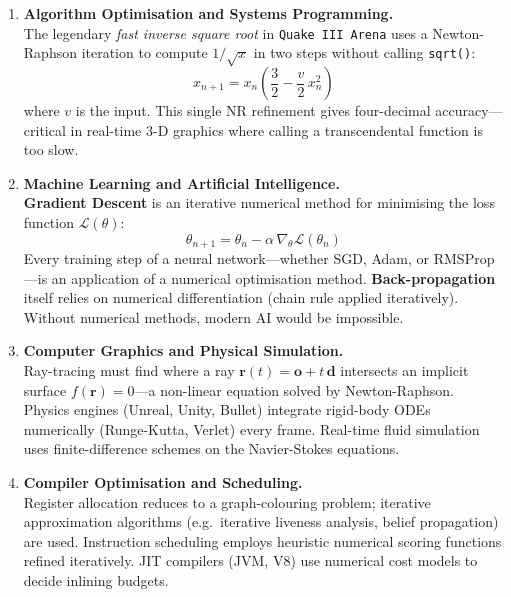 \documentclass[12pt]{article}
\begin{document}
\begin{enumerate}[noitemsep, topsep=6pt, leftmargin=*, label=\textbf{\arabic*.}]

  \item \textbf{Algorithm Optimisation and Systems Programming.}\\
        The legendary \emph{fast inverse square root} in \texttt{Quake III Arena} uses a Newton-Raphson iteration to compute $1/\!\sqrt{x}$ in two steps without calling \texttt{sqrt()}:
        \[
          x_{n+1} = x_n\!\left(\frac{3}{2} - \frac{v}{2}\,x_n^2\right)
        \]
        where $v$ is the input. This single NR refinement gives four-decimal accuracy---critical in real-time 3-D graphics where calling a transcendental function is too slow.

  \item \textbf{Machine Learning and Artificial Intelligence.}\\
        \textbf{Gradient Descent} is an iterative numerical method for minimising the loss function $\mathcal{L}(\theta)$:
        \[
          \theta_{n+1} = \theta_n - \alpha\,\nabla_\theta \mathcal{L}(\theta_n)
        \]
        Every training step of a neural network---whether SGD, Adam, or RMSProp---is an application of a numerical optimisation method. \textbf{Back-propagation} itself relies on numerical differentiation (chain rule applied iteratively). Without numerical methods, modern AI would be impossible.

  \item \textbf{Computer Graphics and Physical Simulation.}\\
        Ray-tracing must find where a ray $\mathbf{r}(t) = \mathbf{o} + t\,\mathbf{d}$ intersects an implicit surface $f(\mathbf{r}) = 0$---a non-linear equation solved by Newton-Raphson. Physics engines (Unreal, Unity, Bullet) integrate rigid-body ODEs numerically (Runge-Kutta, Verlet) every frame. Real-time fluid simulation uses finite-difference schemes on the Navier-Stokes equations.

  \item \textbf{Compiler Optimisation and Scheduling.}\\
        Register allocation reduces to a graph-colouring problem; iterative approximation algorithms (e.g.\ iterative liveness analysis, belief propagation) are used. Instruction scheduling employs heuristic numerical scoring functions refined iteratively. JIT compilers (JVM, V8) use numerical cost models to decide inlining budgets.


\end{enumerate}
\end{document}
